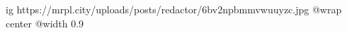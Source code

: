  
 
 
 
 

\ifcmt
  ig https://mrpl.city/uploads/posts/redactor/6bv2npbmmvwuuyzc.jpg
  @wrap center
  @width 0.9
\fi
